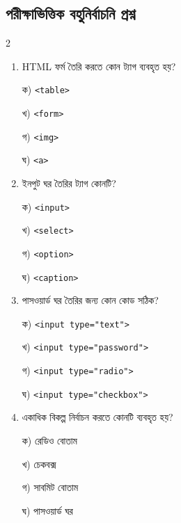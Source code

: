 \subsection{পরীক্ষাভিত্তিক বহুনির্বাচনি প্রশ্ন}

\begin{multicols}{2}
\begin{enumerate}[leftmargin=*,itemsep=5pt]
\item \begin{minipage}[t]{\linewidth}\vspace{0pt}
HTML ফর্ম তৈরি করতে কোন ট্যাগ ব্যবহৃত হয়?
\par ক) \texttt{<table>}
\par খ) \texttt{<form>}
\par গ) \texttt{<img>}
\par ঘ) \texttt{<a>}
\end{minipage}

\item \begin{minipage}[t]{\linewidth}\vspace{0pt}
ইনপুট ঘর তৈরির ট্যাগ কোনটি?
\par ক) \texttt{<input>}
\par খ) \texttt{<select>}
\par গ) \texttt{<option>}
\par ঘ) \texttt{<caption>}
\end{minipage}

\item \begin{minipage}[t]{\linewidth}\vspace{0pt}
পাসওয়ার্ড ঘর তৈরির জন্য কোন কোড সঠিক?
\par ক) \texttt{<input type="text">}
\par খ) \texttt{<input type="password">}
\par গ) \texttt{<input type="radio">}
\par ঘ) \texttt{<input type="checkbox">}
\end{minipage}

\item \begin{minipage}[t]{\linewidth}\vspace{0pt}
একাধিক বিকল্প নির্বাচন করতে কোনটি ব্যবহৃত হয়?
\par ক) রেডিও বোতাম
\par খ) চেকবক্স
\par গ) সাবমিট বোতাম
\par ঘ) পাসওয়ার্ড ঘর
\end{minipage}


\end{enumerate}
\end{multicols}
